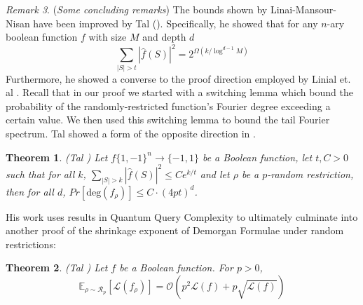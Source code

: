 \documentclass{amsart}
\newtheorem{theorem}{Theorem}[section]
\theoremstyle{definition}
\theoremstyle{remark}
\newtheorem{remark}[theorem]{Remark}
\numberwithin{equation}{section}
\theoremstyle{remark}
\begin{document}
\begin{remark}{(\emph{Some concluding remarks})}
  The bounds shown by Linai-Mansour-Nisan have been improved by Tal (\cite{tal}). Specifically, he showed that for any $n$-ary boolean function $f$ with size $M$ and depth $d$
  \begin{equation}
    \sum_{|S| > t} |\hat{f}(S)|^2 = 2^{\Omega(k/\log^{d-1}{M})}
  \end{equation}
  Furthermore, he showed a converse to the proof direction employed by Linial et. al \cite{lmn}. Recall that in our proof we started with a switching lemma which bound the probability of the randomly-restricted function's Fourier degree exceeding a certain value. We then used this switching lemma to bound the tail Fourier spectrum. Tal showed a form of the opposite direction in \cite{talshrinkage}.
  \begin{theorem}{\emph{(Tal \cite{talshrinkage})}}
    Let $f\{1,-1\}^n \rightarrow \{-1,1\}$ be a Boolean function, let $t,C > 0$ such that for all $k$, $\sum_{|S| > k} |\hat{f}(S)|^2 \leq C e^{k/t}$ and let $\rho$ be a $p$-random restriction, then for all $d$, $Pr[\text{deg}(f_{\rho})] \leq C \cdot (4pt)^d$.
  \end{theorem}
  His work uses results in Quantum Query Complexity to ultimately culminate into another proof of the shrinkage exponent of Demorgan Formulae under random restrictions:
  \begin{theorem}{\emph{(Tal \cite{talshrinkage})}}
    Let $f$ be a Boolean function. For $p > 0$,
    \begin{equation}
      \mathbb{E}_{\rho \sim \mathcal{R}_p}[\mathcal{L}(f_\rho)] = \mathcal{O} \left(p^2\mathcal{L}(f) + p\sqrt{\mathcal{L}(f)} \right)
    \end{equation}
  \end{theorem}
\end{remark}


\end{document}
